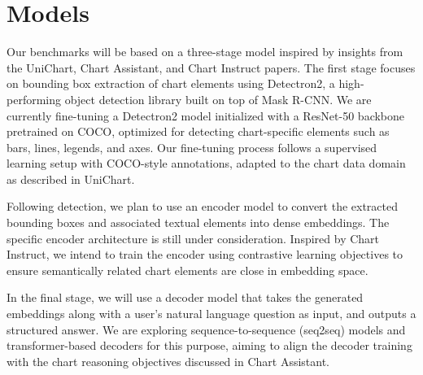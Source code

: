 \documentclass[11pt]{article}
\begin{document}
\section{Models} 
Our benchmarks will be based on a three-stage model inspired by insights from the UniChart, Chart Assistant, and Chart Instruct papers. The first stage focuses on bounding box extraction of chart elements using Detectron2, a high-performing object detection library built on top of Mask R-CNN. We are currently fine-tuning a Detectron2 model initialized with a ResNet-50 backbone pretrained on COCO, optimized for detecting chart-specific elements such as bars, lines, legends, and axes. Our fine-tuning process follows a supervised learning setup with COCO-style annotations, adapted to the chart data domain as described in UniChart.

Following detection, we plan to use an encoder model to convert the extracted bounding boxes and associated textual elements into dense embeddings. The specific encoder architecture is still under consideration. Inspired by Chart Instruct, we intend to train the encoder using contrastive learning objectives to ensure semantically related chart elements are close in embedding space.

In the final stage, we will use a decoder model that takes the generated embeddings along with a user's natural language question as input, and outputs a structured answer. We are exploring sequence-to-sequence (seq2seq) models and transformer-based decoders for this purpose, aiming to align the decoder training with the chart reasoning objectives discussed in Chart Assistant.
\end{document}
